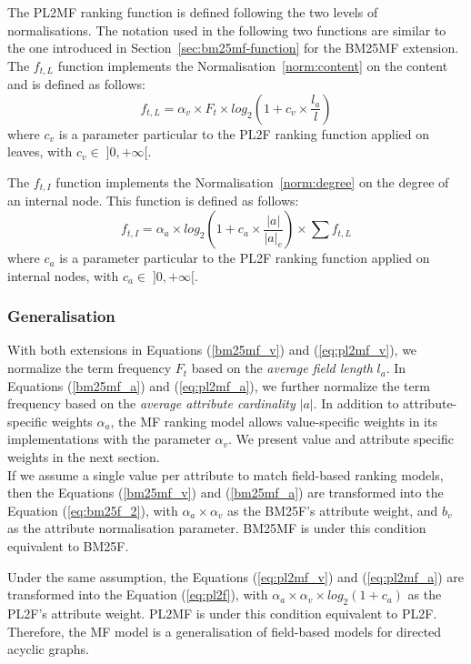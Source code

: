 The \gls{PL2MF} ranking function is defined following the two levels of normalisations. The notation used in the following two functions are similar to the one introduced in Section~\ref{sec:bm25mf-function} for the \gls{BM25MF} extension.
The $f_{t,L}$ function implements the Normalisation~\ref{norm:content} on the content and is defined as follows:
\begin{equation}
\label{eq:pl2mf_v}
f_{t,L} = \alpha_v\times F_t \times log_2\left(1+c_v\times\frac{l_a}{l}\right)
\end{equation}
where $c_v$ is a parameter particular to the PL2F ranking function applied on leaves, with $c_v \in\; ]0,+\infty[$.

The $f_{t,I}$ function implements the Normalisation~\ref{norm:degree} on the degree of an internal node. This function is defined as follows:
\begin{equation}
\label{eq:pl2mf_a}
f_{t,I} = \alpha_a \times log_2\left(1+c_a\times\frac{\left|{a}\right|}{\left|{a}\right|_e}\right) \times \sum{f_{t,L}}
\end{equation}
where $c_a$ is a parameter particular to the PL2F ranking function applied on internal nodes, with $c_a \in\; ]0,+\infty[$.

\subsubsection{Generalisation}

With both extensions in Equations (\ref{bm25mf_v}) and (\ref{eq:pl2mf_v}), we normalize the term frequency $F_t$ based on the \emph{average field length} $l_a$. In Equations (\ref{bm25mf_a}) and (\ref{eq:pl2mf_a}), we further normalize the term frequency based on the \emph{average attribute cardinality} $\left|{a}\right|$.
In addition to attribute-specific weights $\alpha_a$, the \gls{MF} ranking model allows value-specific weights in its implementations with the parameter $\alpha_v$. We present value and attribute specific weights in the next section.\\

If we assume a single value per attribute to match field-based ranking models, then the Equations (\ref{bm25mf_v}) and (\ref{bm25mf_a}) are transformed into the Equation (\ref{eq:bm25f_2}), with $\alpha_a\times\alpha_v$ as the BM25F's attribute weight, and $b_v$ as the attribute normalisation parameter. \gls{BM25MF} is under this condition equivalent to BM25F.

Under the same assumption, the Equations (\ref{eq:pl2mf_v}) and (\ref{eq:pl2mf_a}) are transformed into the Equation (\ref{eq:pl2f}), with $\alpha_a\times\alpha_v\times log_2(1+c_a)$ as the PL2F's attribute weight. \gls{PL2MF} is under this condition equivalent to PL2F.\\

Therefore, the \gls{MF} model is a generalisation of field-based models for directed acyclic graphs.
